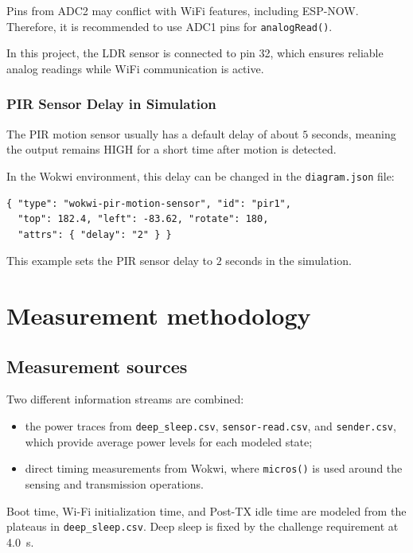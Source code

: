 \documentclass[11pt,a4paper]{article}
\begin{document}
Pins from ADC2 may conflict with WiFi features, including ESP-NOW. Therefore, it is recommended to use ADC1 pins for \texttt{analogRead()}.

In this project, the LDR sensor is connected to pin 32, which ensures reliable analog readings while WiFi communication is active.

\subsubsection*{PIR Sensor Delay in Simulation}

The PIR motion sensor usually has a default delay of about $5$ seconds, meaning the output remains HIGH for a short time after motion is detected.

In the Wokwi environment, this delay can be changed in the \texttt{diagram.json} file:

\begin{verbatim}
{ "type": "wokwi-pir-motion-sensor", "id": "pir1",
  "top": 182.4, "left": -83.62, "rotate": 180,
  "attrs": { "delay": "2" } }
\end{verbatim}

This example sets the PIR sensor delay to $2$ seconds in the simulation.

\section{Measurement methodology}
\subsection{Measurement sources}
Two different information streams are combined:
\begin{itemize}[leftmargin=1.5em]
\item the power traces from \texttt{deep\_sleep.csv}, \texttt{sensor-read.csv}, and \texttt{sender.csv}, which provide average power levels for each modeled state;
\item direct timing measurements from Wokwi, where \texttt{micros()} is used around the sensing and transmission operations.
\end{itemize}
Boot time, Wi-Fi initialization time, and Post-TX idle time are modeled from the plateaus in \texttt{deep\_sleep.csv}. Deep sleep is fixed by the challenge requirement at \SI{4.0}{s}.
\end{document}

